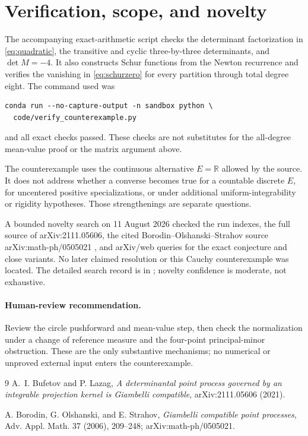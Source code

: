 \documentclass[11pt]{article}
\newcommand{\R}{\mathbb R}
\begin{document}
\section{Verification, scope, and novelty}

The accompanying exact-arithmetic script
 checks the determinant factorization in
\eqref{eq:quadratic}, the transitive and cyclic three-by-three determinants,
and $\det M=-4$.  It also constructs Schur functions from the Newton
recurrence and verifies the vanishing in \eqref{eq:schurzero} for every
partition through total degree eight.  The command used was
\begin{verbatim}
conda run --no-capture-output -n sandbox python \
  code/verify_counterexample.py
\end{verbatim}
and all exact checks passed.  These checks are not substitutes for the
all-degree mean-value proof or the matrix argument above.

The counterexample uses the continuous alternative $E=\R$ allowed by the
source.  It does not address whether a converse becomes true for a countable
discrete $E$, for uncentered positive specializations, or under additional
uniform-integrability or rigidity hypotheses.  Those strengthenings are
separate questions.

A bounded novelty search on 11 August 2026 checked the run indexes, the full
source of arXiv:2111.05606, the cited Borodin--Olshanski--Strahov source
arXiv:math-ph/0505021 \cite{bos}, and arXiv/web queries for the exact
conjecture and close variants.  No later claimed resolution or this Cauchy
counterexample was located.  The detailed search record is in
; novelty confidence is moderate, not exhaustive.

\paragraph{Human-review recommendation.}
Review the circle pushforward and mean-value step, then check the normalization
under a change of reference measure and the four-point principal-minor
obstruction.  These are the only substantive mechanisms; no numerical or
unproved external input enters the counterexample.

\begin{thebibliography}{9}
A.~I. Bufetov and P. Lazag,
\emph{A determinantal point process governed by an integrable projection
kernel is Giambelli compatible}, arXiv:2111.05606 (2021).

A. Borodin, G. Olshanski, and E. Strahov,
\emph{Giambelli compatible point processes},
Adv. Appl. Math. 37 (2006), 209--248; arXiv:math-ph/0505021.
\end{thebibliography}
\end{document}
